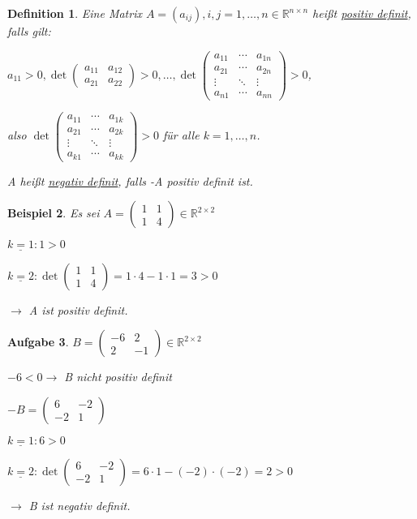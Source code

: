 \documentclass[12pt,a4paper]{scrreprt}
\newtheorem{defi}{Definition}[section]
\newtheorem{beispiel}[defi]{Beispiel}
\newtheorem{aufg}[defi]{Aufgabe}
\begin{document}
\begin{defi}
	Eine Matrix $A=(a_{ij}), i,j=1,\dots,n \in \mathbb{R}^{n\times n}$ heißt \underline{positiv definit}, falls gilt:


	$a_{11}>0,\det\begin{pmatrix}
	a_{11} & a_{12} \\ a_{21} & a_{22}
	\end{pmatrix} > 0, \dots, \det\begin{pmatrix}
	a_{11} & \cdots & a_{1n} \\
	a_{21} & \cdots & a_{2n} \\
	\vdots & \ddots & \vdots \\
	a_{n1} & \cdots & a_{nn}
	\end{pmatrix} > 0$, 
	
	also $\det\begin{pmatrix}
	a_{11} & \cdots & a_{1k} \\
	a_{21} & \cdots & a_{2k} \\
	\vdots & \ddots & \vdots \\
	a_{k1} & \cdots & a_{kk}
	\end{pmatrix} > 0$ für alle $k=1,\dots,n$.
	
	A heißt \underline{negativ definit}, falls -A positiv definit ist.
\end{defi}

\begin{beispiel}
	Es sei $A=\begin{pmatrix}
	1 & 1 \\ 1 & 4
	\end{pmatrix} \in \mathbb{R}^{2\times 2}$
	
	$\underline{k=1}:1>0$
	
	$\underline{k=2}: \det\begin{pmatrix}
	1 & 1 \\ 1 & 4
	\end{pmatrix} = 1\cdot4-1\cdot1=3>0$
	
	$\to$ A ist positiv definit.
\end{beispiel}

\begin{aufg}
	$B=\begin{pmatrix}
	-6 & 2 \\ 2 & -1
	\end{pmatrix} \in \mathbb{R}^{2\times 2}$
	
	$-6<0 \to$ B nicht positiv definit
	
	$-B=\begin{pmatrix}
	6 & -2 \\ -2 & 1
	\end{pmatrix}$
	
	$\underline{k=1}:6>0$
	
	$\underline{k=2}: \det\begin{pmatrix}
	6 & -2 \\ -2 & 1
	\end{pmatrix} = 6\cdot1 - (-2)\cdot(-2)=2>0$
	
	$\to$ B ist negativ definit.
\end{aufg}
\end{document}
